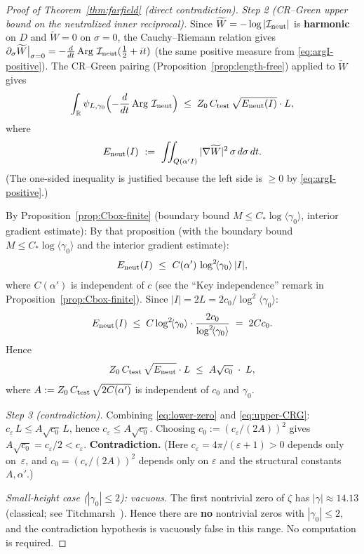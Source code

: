 \documentclass[11pt]{amsart}
\theoremstyle{definition}
\theoremstyle{remark}
\newcommand{\angles}[1]{\langle #1\rangle}
\DeclareMathOperator{\Arg}{Arg}
\begin{document}
\begin{proof}[Proof of Theorem~\ref{thm:farfield} (direct contradiction)]
\medskip\noindent\emph{Step 2 (CR--Green upper bound on the neutralized inner reciprocal).}
Since \(\widetilde W=-\log|\mathcal I_{\rm neut}|\) is \textbf{harmonic} on \(D\)
and \(\widetilde W=0\) on \(\sigma=0\),
the Cauchy--Riemann relation gives
\(\partial_\sigma\widetilde W\big|_{\sigma=0}=-\frac{d}{dt}\Arg\,\mathcal I_{\rm neut}(\tfrac12+it)\)
(the same positive measure from \eqref{eq:argI-positive}).
The CR--Green pairing (Proposition~\ref{prop:length-free}) applied to \(\widetilde W\) gives
\[
  \int_{\mathbb R}\psi_{L,\gamma_0}\Bigl(-\frac{d}{dt}\Arg\,\mathcal I_{\rm neut}\Bigr)
  \;\le\; Z_0\,C_{\rm test}\,\sqrt{E_{\rm neut}(I)}\cdot L,
\]
where
\[
  E_{\rm neut}(I)\ :=\ \iint_{Q(\alpha'I)}|\nabla\widetilde W|^2\,\sigma\,d\sigma\,dt.
\]
(The one-sided inequality is justified because the left side is \(\ge 0\)
by \eqref{eq:argI-positive}.)

By Proposition~\ref{prop:Cbox-finite}
(boundary bound \(M\le C_*\log\angles{\gamma_0}\), interior gradient estimate):
By that proposition (with the boundary bound \(M\le C_*\log\angles{\gamma_0}\)
and the interior gradient estimate):
\[
  E_{\rm neut}(I)\ \le\ C(\alpha')\,\log^2\!\angles{\gamma_0}\,|I|,
\]
where \(C(\alpha')\) is independent of \(c\)
(see the ``Key independence'' remark in Proposition~\ref{prop:Cbox-finite}).
Since \(|I|=2L=2c_0/\log^2\!\angles{\gamma_0}\):
\[
  E_{\rm neut}(I)\;\le\; C\log^2\!\angles{\gamma_0}\cdot\frac{2c_0}{\log^2\!\angles{\gamma_0}}
  \;=\;2Cc_0.
\]
Hence
\begin{equation}\label{eq:upper-CRG}
  Z_0\,C_{\rm test}\,\sqrt{E_{\rm neut}}\cdot L
  \;\le\; A\sqrt{c_0}\;\cdot\;L,
\end{equation}
where \(A:=Z_0\,C_{\rm test}\,\sqrt{2C(\alpha')}\) is independent of \(c_0\) and \(\gamma_0\).

\medskip\noindent\emph{Step 3 (contradiction).}
Combining \eqref{eq:lower-zero} and \eqref{eq:upper-CRG}:
\(c_\varepsilon\,L\le A\sqrt{c_0}\,L\), hence \(c_\varepsilon\le A\sqrt{c_0}\).
Choosing \(c_0:=(c_\varepsilon/(2A))^2\) gives \(A\sqrt{c_0}=c_\varepsilon/2<c_\varepsilon\).
\textbf{Contradiction.}
(Here \(c_\varepsilon=4\pi/(\varepsilon+1)>0\) depends only on~\(\varepsilon\),
and \(c_0=(c_\varepsilon/(2A))^2\) depends only on \(\varepsilon\) and the structural
constants \(A,\alpha'\).)

\medskip\noindent\emph{Small-height case ($|\gamma_0|\le 2$): vacuous.}
The first nontrivial zero of \(\zeta\) has \(|\gamma|\approx 14.13\)
(classical; see Titchmarsh~\cite[Ch.~X]{Titchmarsh}).
Hence there are \textbf{no} nontrivial zeros with \(|\gamma_0|\le 2\),
and the contradiction hypothesis is vacuously false in this range.
No computation is required.
\end{proof}
\end{document}
